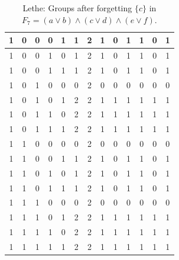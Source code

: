 \begin{table}[!tb]
\begin{tabular}{|c|c|c|c|c|c|c|c|c|c|c|c|c|}
        \rowcolor{red!40} 1 & 0 & 0 & 0 & 1 & 1 & 2 & 1 & 0 & 1 & 1 & 0 & 1 \\ \hline
        \rowcolor{green!40} 1 & 0 & 0 & 1 & 0 & 1 & 2 & 1 & 0 & 1 & 1 & 0 & 1 \\ \hline
        \rowcolor{yellow!40} 1 & 0 & 0 & 1 & 1 & 1 & 2 & 1 & 0 & 1 & 1 & 0 & 1 \\ \hline
        \rowcolor{gray!40} 1 & 0 & 1 & 0 & 0 & 0 & 2 & 0 & 0 & 0 & 0 & 0 & 0 \\ \hline
        \rowcolor{blue!40} 1 & 0 & 1 & 0 & 1 & 2 & 2 & 1 & 1 & 1 & 1 & 1 & 1 \\ \hline
        \rowcolor{red!40} 1 & 0 & 1 & 1 & 0 & 2 & 2 & 1 & 1 & 1 & 1 & 1 & 1 \\ \hline
        \rowcolor{green!40} 1 & 0 & 1 & 1 & 1 & 2 & 2 & 1 & 1 & 1 & 1 & 1 & 1 \\ \hline
        \rowcolor{yellow!40} 1 & 1 & 0 & 0 & 0 & 0 & 2 & 0 & 0 & 0 & 0 & 0 & 0 \\ \hline
        \rowcolor{gray!40} 1 & 1 & 0 & 0 & 1 & 1 & 2 & 1 & 0 & 1 & 1 & 0 & 1 \\ \hline
        \rowcolor{blue!40} 1 & 1 & 0 & 1 & 0 & 1 & 2 & 1 & 0 & 1 & 1 & 0 & 1 \\ \hline
        \rowcolor{red!40} 1 & 1 & 0 & 1 & 1 & 1 & 2 & 1 & 0 & 1 & 1 & 0 & 1 \\ \hline
        \rowcolor{green!40} 1 & 1 & 1 & 0 & 0 & 0 & 2 & 0 & 0 & 0 & 0 & 0 & 0 \\ \hline
        \rowcolor{yellow!40} 1 & 1 & 1 & 0 & 1 & 2 & 2 & 1 & 1 & 1 & 1 & 1 & 1 \\ \hline
        \rowcolor{gray!40} 1 & 1 & 1 & 1 & 0 & 2 & 2 & 1 & 1 & 1 & 1 & 1 & 1 \\ \hline
        \rowcolor{blue!40} 1 & 1 & 1 & 1 & 1 & 2 & 2 & 1 & 1 & 1 & 1 & 1 & 1 \\ \hline
    \end{tabular}
    \caption{Lethe: Groups after forgetting $\{c\}$ in $F_{7} = (a \lor b) \land (c \lor d) \land (e \lor f)$.}
    \label{tab:lethe-F7-c-groups}
\end{table}

